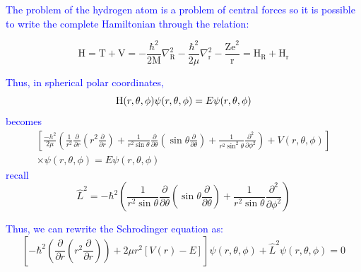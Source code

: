 \documentclass{article}
\begin{document}
\textcolor{blue}{The problem of the hydrogen atom is a problem of central forces so it is possible to write the complete Hamiltonian through the relation:}

 \begin{equation}
     \mathrm{H}=\mathrm{T}+\mathrm{V}=-\frac{\hbar^{2}}{2 \mathrm{M}} \nabla_{\mathrm{R}}^{2}-\frac{\hbar^{2}}{2 \mu} \nabla_{\mathrm{r}}^{2}-\frac{\mathrm{Ze}^{2}}{\mathrm{r}}=\mathrm{H}_{\mathrm{R}}+\mathrm{H}_{\mathrm{r}}
 \end{equation}
 
 \textcolor{blue}{Thus, in spherical polar coordinates,}
 \begin{equation}
   \mathrm{H}(r, \theta, \phi) \psi(r, \theta, \phi)=E \psi(r, \theta, \phi)\\
\end{equation}
 \textcolor{blue}{becomes}
 \begin{equation}
\begin{array}{r}
{\left[\frac{-h^{2}}{2 \mu}\left(\frac{1}{r^{2}} \frac{\partial}{\partial r}\left(r^{2} \frac{\partial}{\partial r}\right)+\frac{1}{r^{2} \sin \theta} \frac{\partial}{\partial \theta}\left(\sin \theta \frac{\partial}{\partial \theta}\right)+\frac{1}{r^{2} \sin ^{2} \theta} \frac{\partial^{2}}{\partial \phi^{2}}\right)+V(r, \theta, \phi)\right]} \\
\times\psi(r, \theta, \phi)=E \psi(r, \theta, \phi)
\end{array}
\end{equation}
 \textcolor{blue}{recall}
 \begin{equation}
    \hat{L}^{2}=-\hbar^{2}\left(\frac{1}{r^{2} \sin \theta} \frac{\partial}{\partial \theta}\left(\sin \theta \frac{\partial}{\partial \theta}\right)+\frac{1}{r^{2} \sin \theta} \frac{\partial^{2}}{\partial \phi^{2}}\right)
\end{equation}
 
 \textcolor{blue}{Thus, we can rewrite the Schrodinger equation as:}
 \begin{equation}
    \left[-\hbar^{2}\left(\frac{\partial}{\partial r}\left(r^{2} \frac{\partial}{\partial r}\right)\right)+2 \mu r^{2}[V(r)-E]\right] \psi(r, \theta, \phi)+\hat{L}^{2} \psi(r, \theta, \phi)=0
\end{equation}
\end{document}
